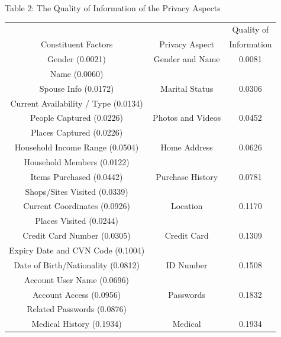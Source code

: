 \documentclass{icmmcm}
\begin{document}

\begin{center}
\caption{Table 2: The Quality of Information of the Privacy Aspects}
\begin{tabular}{ c|c|c } 
 & & Quality of \\ 
 Constituent Factors & Privacy Aspect & Information \\
 \hline \hline
 Gender (0.0021)                            & Gender and Name    & 0.0081  \\
 Name (0.0060)                              &                    &               \\
 \hline
 Spouse Info (0.0172)                       & Marital Status     & 0.0306  \\
 Current Availability / Type (0.0134)       &                    &              \\
 \hline
 People Captured (0.0226)                   & Photos and Videos  & 0.0452  \\
 Places Captured (0.0226)                   &                    &               \\
 \hline
 Household Income Range (0.0504)            & Home Address       & 0.0626  \\
 Household Members (0.0122)                 &                    &               \\
 \hline
 Items Purchased (0.0442)                   & Purchase History   & 0.0781  \\
 Shops/Sites Visited (0.0339)               &                    &               \\
 \hline
 Current Coordinates (0.0926)               & Location           & 0.1170  \\
 Places Visited (0.0244)                    &                    &               \\
 \hline
 Credit Card Number (0.0305)                & Credit Card        & 0.1309  \\
 Expiry Date and CVN Code (0.1004)          &                    &               \\
 \hline
 Date of Birth/Nationality (0.0812)         & ID Number          & 0.1508  \\
 Account User Name (0.0696)                 &                    &               \\
 \hline
 Account Access (0.0956)                    & Passwords          & 0.1832  \\
 Related Passwords (0.0876)                 &                    &               \\
 \hline
 Medical History (0.1934)                   & Medical            & 0.1934  \\
\end{tabular}

\end{center}
\end{document}
